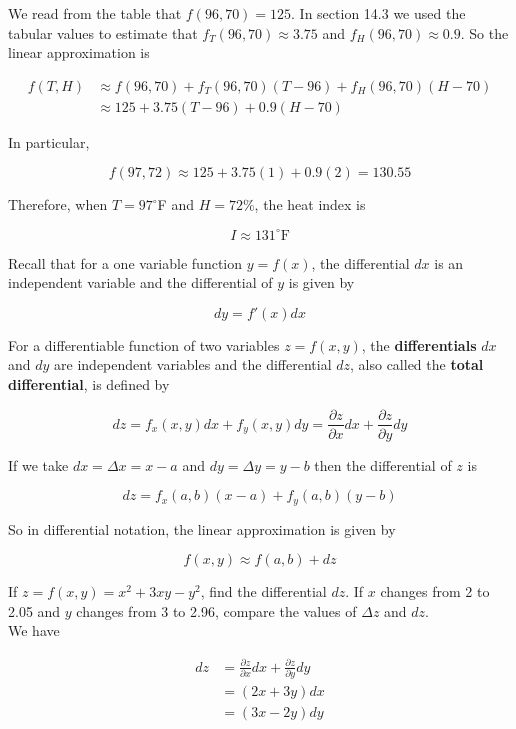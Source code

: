         We read from the table that $f(96, 70) = 125$. In section 14.3 we used the tabular values to estimate that $f_T (96, 70) \approx 3.75$ and $f_H (96, 70) \approx 0.9$. So the linear approximation is

        \begin{align*}
            f(T,H)  &\approx f(96,70) + f_T (96,70)(T-96) + f_H (96,70) (H-70) \\
                    &\approx 125 + 3.75(T-96) + 0.9(H-70)
        \end{align*}

        In particular,

        \[
            f(97,72) \approx 125 + 3.75(1) + 0.9(2) = 130.55
        \]

        Therefore, when $T=97^{\circ}$F and $H=72\%$, the heat index is

        \[
            I   \approx 131^{\circ}\text{F}
        \]

        Recall that for a one variable function $y=f(x)$, the differential $dx$ is an independent variable and the differential of $y$ is given by

        \[
            dy = f'(x) dx
        \]

        For a differentiable function of two variables $z=f(x,y)$, the \textbf{differentials} $dx$ and $dy$ are independent variables and the differential $dz$, also called the \textbf{total differential}, is defined by

        \[
            dz = f_x (x,y) dx + f_y (x,y) dy = \frac{\partial z}{\partial x}dx + \frac{\partial z}{\partial y}dy
        \]

        If we take $dx=\Delta x = x-a$ and $dy = \Delta y = y-b$ then the differential of $z$ is

        \[
            dz = f_x (a,b) (x-a) + f_y (a,b) (y-b)
        \]

        So in differential notation, the linear approximation is given by

        \[
            f(x,y) \approx f(a,b) + dz
        \]

        \textit{} If $z=f(x,y) = x^2 + 3xy - y^2$, find the differential $dz$. If $x$ changes from 2 to 2.05 and $y$ changes from 3 to 2.96, compare the values of $\Delta z$ and $dz$. \\

        We have

        \begin{align*}
            dz  &= \frac{\partial z}{\partial x}dx + \frac{\partial z}{\partial y} dy \\
                &= (2x + 3y) dx \\
                &= (3x - 2y) dy
        \end{align*}

